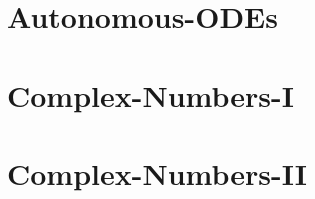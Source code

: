 \documentclass{beamer}
\begin{document}


\part{Autonomous-ODEs}






\part{Complex-Numbers-I}



\part{Complex-Numbers-II}







\newcommand{\arrayTwo}[4]{
  \left[
  \begin{array}{rr}
    #1 & #2 \\
    #3 & #4
  \end{array}
  \right]
}

\newcommand{\vecTwo}[2]{
  \left[
  \begin{array}{r}
    #1 \\  #2
  \end{array}
  \right]
}


\newcommand{\stateTwo}[2]{
  \begin{array}{rr}
    \mbox{\fontsize{6}{6}\selectfont $#1$} \\  \mbox{\fontsize{6}{6}\selectfont $#2$}
  \end{array}
}


\newcommand{\arrayThree}[9]{
  \left[
    \begin{array}{rrr}
      #1 & #2 & #3 \\
      #4 & #5 & #6 \\
      #7 & #8 & #9
    \end{array}
  \right]
}

\newcommand{\startRowOps}{
  \left[
    \begin{array}{rrr|r}
}
\end{document}
